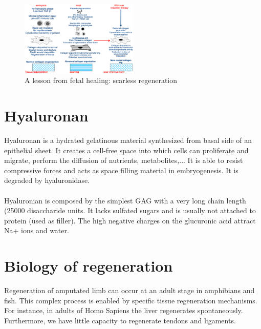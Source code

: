 \begin{figure}[h]
\centering
\includegraphics[width=0.5\textwidth]{scar.png}
\caption{\label{fig:scar}A lesson from fetal healing: scarless regeneration}
\end{figure}

\section{Hyaluronan}
Hyaluronan is a hydrated gelatinous material	synthesized from basal side of an epithelial sheet. 
It creates a cell-free space into which cells can proliferate and migrate, perform the diffusion of nutrients, metabolites,...
It is able to resist compressive forces and acts as space filling material in embryogenesis.
It is degraded by hyaluronidase.
\\
\\
\noindent
Hyaluronian is composed by the simplest GAG with a very long chain length (25000 disaccharide units. It lacks sulfated sugars and is usually not attached to protein (used as filler). The high negative charges on the glucuronic acid attract Na+ ions and water.
 

\section{Biology of regeneration}
Regeneration of amputated limb can occur at an adult stage in amphibians and fish.
This complex process is enabled by specific tissue regeneration mechanisms.
For instance,  in adults of Homo Sapiens the liver regenerates spontaneously. 
Furthermore, we have little capacity to regenerate tendons and ligaments. 
 

